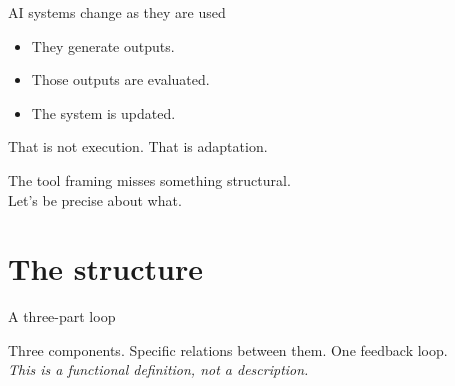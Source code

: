 \documentclass[aspectratio=169, 10pt]{beamer}
\begin{document}
\begin{frame}{AI systems change as they are used}
  \begin{itemize}
    \item They generate outputs.
    \item Those outputs are evaluated.
    \item The system is updated.
  \end{itemize}

  \bigskip

  That is not execution. That is adaptation.\\[0.5em]

  \begin{alertblock}{}
    \centering
    The tool framing misses something structural.\\
    Let's be precise about what.
  \end{alertblock}
\end{frame}

\section{The structure}

\begin{frame}{A three-part loop}
  \begin{center}
  \end{center}

  \bigskip
  Three components. Specific relations between them. One feedback loop.\\[0.4em]
  \textit{This is a functional definition, not a description.}
\end{frame}
\end{document}
